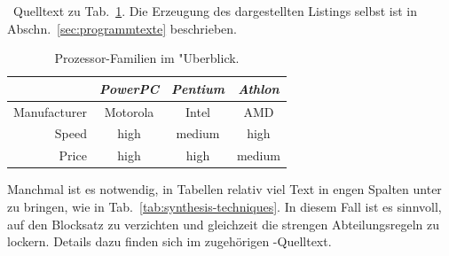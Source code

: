 \begin{program}
\caption{\latex\ Quelltext zu Tab.~\ref{tab:processors}.
Die Erzeugung des dargestellten Listings selbst ist in Abschn.\ \ref{sec:programmtexte} beschrieben.}
\label{prog:processors-source}
%
\begin{LaTeXCode}
\begin{table}
\caption{Prozessor-Familien im "Uberblick.}
\label{tab:processors}
\centering
\setlength{\tabcolsep}{5mm}	%
\def\arraystretch{1.25}		%
\begin{tabular}{|r||c|c|c|} \hline
& \emph{PowerPC} & \emph{Pentium} & \emph{Athlon} \\
\hline\hline
Manufacturer & Motorola & Intel & AMD \\
\hline
Speed & high & medium & high   \\
\hline
Price & high & high   & medium \\
\hline
\end{tabular}
\end{table}
\end{LaTeXCode}
%
\end{program}

Manchmal ist es notwendig, in Tabellen relativ viel Text in engen Spalten
unter zu bringen, wie in Tab.~\ref{tab:synthesis-techniques}. In diesem Fall
ist es sinnvoll, auf den Blocksatz zu verzichten und gleichzeit die
strengen Abteilungsregeln zu lockern. Details dazu finden sich im zugehörigen
\latex-Quelltext.


